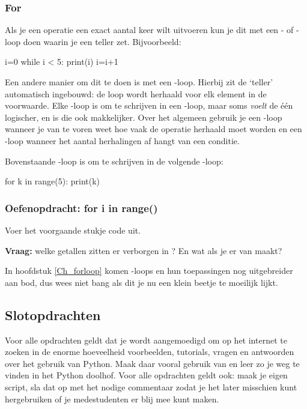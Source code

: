 \documentclass[a4paper,11pt, fleqn]{article}
\begin{document}
\subsubsection{For}
Als je een operatie een exact aantal keer wilt uitvoeren kun je dit met een - of -loop doen waarin je een teller zet. Bijvoorbeeld:
\begin{python}
i=0
while i < 5:
    print(i)
    i=i+1
\end{python}
Een andere manier om dit te doen is met een -loop. Hierbij zit de `teller' automatisch ingebouwd: de loop wordt herhaald voor elk element in de voorwaarde. Elke -loop is om te schrijven in een -loop, maar soms \textit{voelt} de \'e\'en logischer, en is die ook makkelijker. Over het algemeen gebruik je een -loop wanneer je van te voren weet hoe vaak de operatie herhaald moet worden en een -loop wanneer het aantal herhalingen af hangt van een conditie.

Bovenstaande -loop is om te schrijven in de volgende -loop:
\begin{python}
for k in range(5):
    print(k)
\end{python}

\subsubsection*{Oefenopdracht: for i in range()}
Voer het voorgaande stukje code uit. 

\textbf{Vraag:} welke getallen zitten er verborgen in ? En wat als je er  van maakt?

In hoofdstuk \ref{Ch_forloop} komen -loops en hun toepassingen nog uitgebreider aan bod, dus wees niet bang als dit je nu een klein beetje te moeilijk lijkt.

\subsection{Slotopdrachten}
Voor alle opdrachten geldt dat je wordt aangemoedigd om op het internet te zoeken in de enorme hoeveelheid voorbeelden, tutorials, vragen en antwoorden over het gebruik van Python. Maak daar vooral gebruik van en leer zo je weg te vinden in het Python doolhof. 
Voor alle opdrachten geldt ook: maak je eigen script, sla dat op met het nodige commentaar zodat je het later misschien kunt hergebruiken of je medestudenten er blij mee kunt maken.
\end{document}
